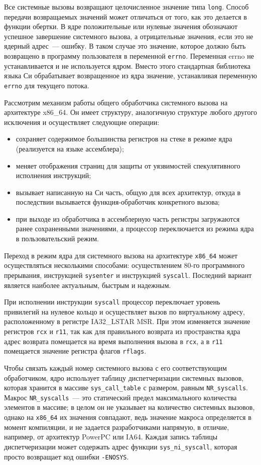 Все системные вызовы возвращают целочисленное значение типа \texttt{long}.
Способ передачи возвращаемых значений может отличаться от того, как это делается
в функции обертки. В ядре положительные или нулевые значения обозначают успешное
завершение системного вызова, а отрицательные значения, если это не ядерный
адрес~--- ошибку. В таком случае это значение, которое должно быть возвращено в
программу пользователя в переменной \texttt{errno}. Переменная errno не
устанавливается и не используется ядром. Вместо этого стандартная библиотека
языка Си обрабатывает возвращенное из ядра значение, устанавливая переменную
\texttt{errno} для текущего потока.

Рассмотрим механизм работы общего обработчика системного вызова на архитектуре
x86\_64. Он имеет структуру, аналогичную структуре любого другого исключения и
осуществляет следующие операции:
\begin{itemize}
\item сохраняет содержимое большинства регистров на стеке в режиме ядра
  (реализуется на языке ассемблера);
\item меняет отображения страниц для защиты от уязвимостей спекулятивного
  исполнения инструкций;
\item вызывает написанную на Си часть, общую для всех архитектур, откуда в
  последствии вызывается функция-обработчик конкретного вызова;
\item при выходе из обработчика в ассемблерную часть регистры загружаются ранее
  сохраненными значениями, а процессор переключается из режима ядра в
  пользовательский режим.
\end{itemize}

Переход в режим ядра для системного вызова на архитектуре \texttt{x86\_64} может
осуществляться несколькими способами: осуществлением 80-го программного
прерывания, инструкцией \texttt{sysenter} и инструкцией \texttt{syscall}.
Последний вариант является наиболее актуальным, быстрым и надежным.

При исполнении инструкции \texttt{syscall} процессор переключает уровень
привилегий на нулевое кольцо и осуществляет вызов по виртуальному адресу,
расположенному в регистре IA32\_LSTAR MSR. При этом изменяется значение
регистров \texttt{rcx} и \texttt{r11}, так как для правильного возврата из
пространства ядра адрес возврата помещается на время выполнения вызова в
\texttt{rcx}, а в \texttt{r11} помещается значение регистра флагов
\texttt{rflags}.

Чтобы связать каждый номер системного вызова с его соответствующим обработчиком,
ядро использует таблицу диспетчеризации системных вызовов, которая хранится в
массиве \texttt{sys\_call\_table} с размером, равным \texttt{NR\_syscalls}.
Макрос \texttt{NR\_syscalls}~--- это статический предел максимального количества
элементов в массиве; в целом он не указывает на количество системных вызовов,
однако на \texttt{x86\_64} их значения совпадают, ведь значение макроса
определяется в момент компиляции, и не задается разработчиками напрямую, в
отличие, например, от архитектур PowerPC или IA64. Каждая запись таблицы
диспетчеризации может содержать адрес функции \texttt{sys\_ni\_syscall}, которая
просто возвращает код ошибки \texttt{-ENOSYS}.

